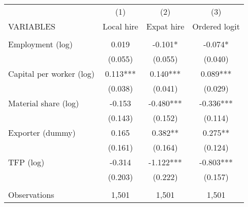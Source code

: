 \begin{tabular}{lccc} \hline
 & (1) & (2) & (3)  \\
VARIABLES & Local hire & Expat hire & Ordered logit \\ \hline
   &  &  &  \\
Employment (log)   & 0.019 & -0.101* & -0.074* \\
   & (0.055) & (0.055) & (0.040) \\
Capital per worker (log)   & 0.113*** & 0.140*** & 0.089*** \\
   & (0.038) & (0.041) & (0.029) \\
Material share (log)   & -0.153 & -0.480*** & -0.336*** \\
   & (0.143) & (0.152) & (0.114) \\
Exporter (dummy)   & 0.165 & 0.382** & 0.275** \\
   & (0.161) & (0.164) & (0.124) \\
TFP (log)   & -0.314 & -1.122*** & -0.803*** \\
   & (0.203) & (0.222) & (0.157) \\
   &  &  &  \\
 Observations & 1,501 & 1,501 & 1,501 \\ \hline
\end{tabular}
